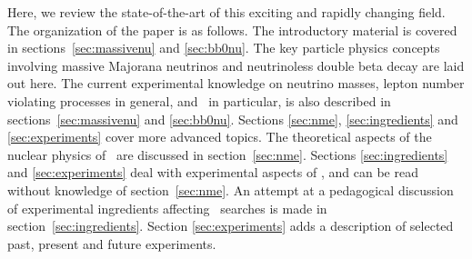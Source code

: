 Here, we review the state-of-the-art of this exciting and rapidly changing field. 
The organization of the paper is as follows. The introductory material is covered in sections~\ref{sec:massivenu} and \ref{sec:bb0nu}. The key particle physics concepts involving massive Majorana neutrinos and neutrinoless double beta decay are laid out here. The current experimental knowledge on neutrino masses, lepton number violating processes in general, and \bbonu\ in particular, is also described in sections~\ref{sec:massivenu} and \ref{sec:bb0nu}. Sections \ref{sec:nme}, \ref{sec:ingredients} and \ref{sec:experiments} cover more advanced topics. The theoretical aspects of the nuclear physics of \bbonu\ are discussed in section~\ref{sec:nme}. Sections \ref{sec:ingredients} and \ref{sec:experiments} deal with experimental aspects of \bbonu, and can be read without knowledge of section~\ref{sec:nme}. An attempt at a pedagogical discussion of experimental ingredients affecting \bbonu\ searches is made in section~\ref{sec:ingredients}. Section \ref{sec:experiments} adds a description of selected past, present and future experiments. 

